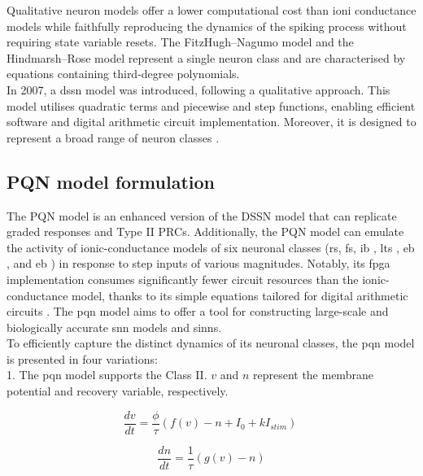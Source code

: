 Qualitative neuron models offer a lower computational cost than ioni conductance models while faithfully reproducing the dynamics of the spiking process without requiring state variable resets. The FitzHugh–Nagumo model and the Hindmarsh–Rose model \cite{Hindmarsh} represent a single neuron class and are characterised by equations containing third-degree polynomials.\\
In 2007, a \acrfull{dssn} \cite{Kohno2007,Nanami2016} model was introduced, following a qualitative approach. This model utilises quadratic terms and piecewise and step functions, enabling efficient software and digital arithmetic circuit implementation. Moreover, it is designed to represent a broad range of neuron classes \cite{NanamiNov2016}.\\

\subsection{PQN model formulation}
\label{subsection:PQN}
The PQN model \cite{Nanami} is an enhanced version of 
the DSSN model that can replicate graded responses and 
Type II PRCs. Additionally, the PQN model can emulate 
the activity of ionic-conductance models of six 
neuronal classes (\acrshort{rs}, \acrshort{fs}, 
\acrshort{ib} \cite{CONNORS}, \acrshort{lts} 
\cite{DestexheLTS}, \acrfull{eb} \cite{Izhikevich1999}, and \acrfull{eb} \cite{Ermentrout}) in response to step 
inputs of various magnitudes. Notably, its \acrshort{fpga} 
implementation consumes significantly fewer circuit 
resources than the ionic-conductance model, thanks to 
its simple equations tailored for digital arithmetic 
circuits \cite{KohnoR}. The \acrshort{pqn} model aims to offer a 
tool for constructing large-scale and biologically 
accurate \acrshort{snn} models and \acrshort{sinn}s.\\
To efficiently capture the distinct dynamics of its neuronal classes, the \acrshort{pqn} model is presented in four variations:\\

1. The \acrshort{pqn} model supports the Class II. $v$ and $n$ represent the membrane potential and recovery variable, respectively.

\begin{equation}
    \frac{dv}{dt}=\frac{\phi}{\tau}\left(f\left(v\right)-n+I_0+kI_{stim}\right)\ 
    \label{eq:PQN1a}
\end{equation}

\begin{equation}
    \frac{dn}{dt}=\frac{1}{\tau}(g\left(v\right)-n)
    \label{eq:PQN1b}
\end{equation}

